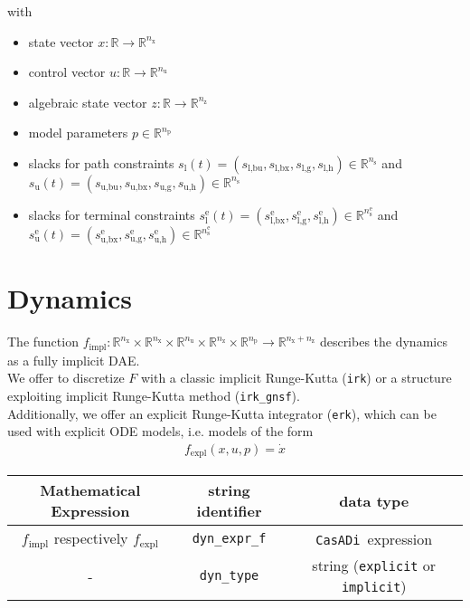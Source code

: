 \documentclass{article}
\newcommand{\code}[1]{\texttt{#1}}
\newcommand{\casadi}{\texttt{CasADi}}
\newcommand{\ind}[1]{_{\textrm{#1}}}
\newcommand{\terminal}{^{\textrm{e}}}
\newcommand{\Lower}{\ind{l}}
\newcommand{\lowerh}{\ind{l,h}}
\newcommand{\lowerbx}{\ind{l,bx}}
\newcommand{\lowerbu}{\ind{l,bu}}
\newcommand{\lowerg}{\ind{l,g}}
\newcommand{\upper}{\ind{u}}
\newcommand{\upperh}{\ind{u,h}}
\newcommand{\upperbx}{\ind{u,bx}}
\newcommand{\upperbu}{\ind{u,bu}}
\newcommand{\upperg}{\ind{u,g}}
\newcommand{\R}{\mathbb{R}}
\newcommand{\nx}{n\ind{x}}
\newcommand{\nuu}{n\ind{u}}
\newcommand{\nz}{n\ind{z}}
\newcommand{\np}{n\ind{p}}
\newcommand{\ns}{n\ind{s}}
\begin{document}
with
\begin{itemize}
\item state vector $ x: \R \rightarrow \R^{\nx} $
\item control vector $ u: \R \rightarrow \R^{\nuu} $
\item algebraic state vector $ z: \R \rightarrow \R^{\nz} $
\item model parameters $ p \in \R^{\np} $
\item slacks for path constraints $ s\Lower(t) = (s\lowerbu, s\lowerbx, s\lowerg, s\lowerh) \in \R^{\ns} $ and $ s\upper(t) = (s\upperbu, s\upperbx, s\upperg, s\upperh) \in \R^{\ns} $
\item slacks for terminal constraints $ s\Lower\terminal(t) = (s\lowerbx\terminal, s\lowerg\terminal, s\lowerh\terminal) \in \R^{\ns\terminal} $ and $ s\upper\terminal(t) = (s\upperbx\terminal, s\upperg\terminal, s\upperh\terminal) \in \R^{\ns\terminal} $
\end{itemize}


\section{Dynamics}
The function $ f\ind{impl}: \mathbb{R}^{\nx}\times\mathbb{R}^{\nx}\times\mathbb{R}^{\nuu}\times\mathbb{R}^{\nz}\times\mathbb{R}^{\np} \rightarrow \mathbb{R}^{\nx+\nz}$ describes the dynamics as a fully implicit DAE.\\
We offer to discretize $ F $ with a classic implicit Runge-Kutta (\code{irk}) or a structure exploiting implicit Runge-Kutta method (\code{irk\_gnsf}).\\
Additionally, we offer an explicit Runge-Kutta integrator (\code{erk}), which can be used with explicit ODE models, i.e. models of the form
\begin{align*}
f\ind{expl}(x,u,p) = \dot{x}
\end{align*}
\begin{table}[h!]
	\centering
	\begin{tabular}{|c|c|c|}
		\toprule
		Mathematical Expression                    & string identifier & data type \\ \midrule
		$ f\ind{impl} $ respectively $ f\ind{expl} $ & \code{dyn\_expr\_f}    & \casadi~expression    \\ \midrule
		- & \code{dyn\_type}    & string (\code{explicit} or \code{implicit})    \\
		\bottomrule
	\end{tabular}
\end{table}
\end{document}
